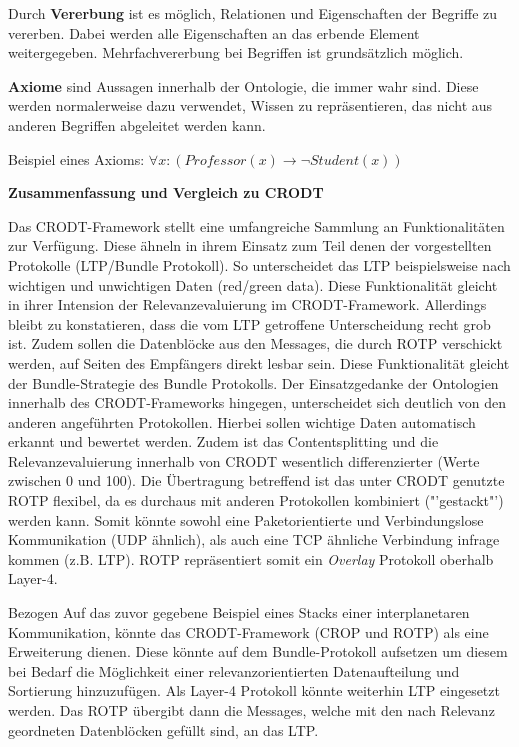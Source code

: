    Durch \textbf{Vererbung} ist es m{\"o}glich, Relationen und Eigenschaften der
   Begriffe zu vererben. Dabei werden alle Eigenschaften an das erbende Element
   weitergegeben. Mehrfachvererbung bei Begriffen ist grunds{\"a}tzlich
   m{\"o}glich.
   
   \textbf{Axiome} sind Aussagen innerhalb der Ontologie, die immer wahr sind.
   Diese werden normalerweise dazu verwendet, Wissen zu repr{\"a}sentieren, das
   nicht aus anderen Begriffen abgeleitet werden kann.
   
   Beispiel eines Axioms:\newline
   $\forall x : (Professor(x) \rightarrow \neg Student(x))$   
      
\textbf{Zusammenfassung und Vergleich zu CRODT}

Das CRODT-Framework stellt eine umfangreiche Sammlung an Funktionalit{\"a}ten
zur Verf{\"u}gung. Diese {\"a}hneln in ihrem Einsatz zum Teil denen der
vorgestellten Protokolle (LTP/Bundle Protokoll). So unterscheidet das LTP
beispielsweise nach wichtigen und unwichtigen Daten (red/green data). Diese
Funktionalit{\"a}t gleicht in ihrer Intension der Relevanzevaluierung im
CRODT-Framework. Allerdings bleibt zu konstatieren, dass die vom LTP getroffene
Unterscheidung recht grob ist. Zudem sollen die
Datenbl{\"o}cke aus den Messages, die durch ROTP verschickt werden, auf Seiten
des Empf{\"a}ngers direkt lesbar sein. Diese Funktionalit{\"a}t gleicht der
Bundle-Strategie des Bundle Protokolls. Der Einsatzgedanke der Ontologien
innerhalb des CRODT-Frameworks hingegen, unterscheidet sich deutlich von den
anderen angef{\"u}hrten Protokollen. Hierbei sollen wichtige Daten automatisch
erkannt und bewertet werden. Zudem ist das Contentsplitting und die
Relevanzevaluierung innerhalb von CRODT wesentlich differenzierter (Werte
zwischen 0 und 100). Die {\"U}bertragung betreffend ist das unter \gls{CRODT}
genutzte \gls{ROTP} flexibel, da es durchaus mit anderen Protokollen kombiniert
("'gestackt"') werden kann. Somit k{\"o}nnte sowohl eine Paketorientierte und
Verbindungslose Kommunikation (UDP {\"a}hnlich), als auch eine TCP {\"a}hnliche
Verbindung infrage kommen (z.B. LTP). ROTP repr{\"a}sentiert somit ein
\textit{Overlay} Protokoll oberhalb Layer-4. 

Bezogen Auf das zuvor gegebene Beispiel eines Stacks einer interplanetaren
Kommunikation, k{\"o}nnte das CRODT-Framework (CROP und ROTP) als eine
Erweiterung dienen. Diese k{\"o}nnte auf dem Bundle-Protokoll aufsetzen um
diesem bei Bedarf die M{\"o}glichkeit einer relevanzorientierten
Datenaufteilung und Sortierung hinzuzuf{\"u}gen. Als Layer-4 Protokoll
k{\"o}nnte weiterhin LTP eingesetzt werden. Das ROTP {\"u}bergibt dann die
Messages, welche mit den nach Relevanz geordneten Datenbl{\"o}cken gef{\"u}llt
sind, an das LTP.

